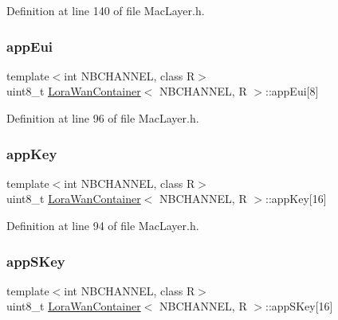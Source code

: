Definition at line 140 of file Mac\+Layer.\+h.

\mbox{\label{class_lora_wan_container_a4cf3acd6dbeebd4bd11f79326fcf5047}} 
\subsubsection{\texorpdfstring{app\+Eui}{appEui}}
{\footnotesize\ttfamily template$<$int N\+B\+C\+H\+A\+N\+N\+EL, class R$>$ \\
uint8\+\_\+t \mbox{\hyperlink{class_lora_wan_container}{Lora\+Wan\+Container}}$<$ N\+B\+C\+H\+A\+N\+N\+EL, R $>$\+::app\+Eui\mbox{[}8\mbox{]}}



Definition at line 96 of file Mac\+Layer.\+h.

\mbox{\label{class_lora_wan_container_a0453cc125759e3b32f8b6e28548dee84}} 
\subsubsection{\texorpdfstring{app\+Key}{appKey}}
{\footnotesize\ttfamily template$<$int N\+B\+C\+H\+A\+N\+N\+EL, class R$>$ \\
uint8\+\_\+t \mbox{\hyperlink{class_lora_wan_container}{Lora\+Wan\+Container}}$<$ N\+B\+C\+H\+A\+N\+N\+EL, R $>$\+::app\+Key\mbox{[}16\mbox{]}}



Definition at line 94 of file Mac\+Layer.\+h.

\mbox{\label{class_lora_wan_container_abc0d832ba6477333a41e558704acc4e9}} 
\subsubsection{\texorpdfstring{app\+S\+Key}{appSKey}}
{\footnotesize\ttfamily template$<$int N\+B\+C\+H\+A\+N\+N\+EL, class R$>$ \\
uint8\+\_\+t \mbox{\hyperlink{class_lora_wan_container}{Lora\+Wan\+Container}}$<$ N\+B\+C\+H\+A\+N\+N\+EL, R $>$\+::app\+S\+Key\mbox{[}16\mbox{]}}



